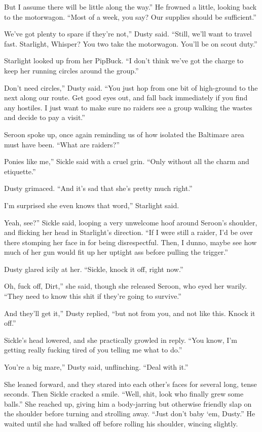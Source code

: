 \leavevmode{}But I assume there will be little along the way.” He frowned a little, looking back to the motorwagon. “Most of a week, you say? Our supplies should be sufficient.”

\leavevmode{}We’ve got plenty to spare if they’re not,” Dusty said. “Still, we’ll want to travel fast. Starlight, Whisper? You two take the motorwagon. You’ll be on scout duty.”

Starlight looked up from her PipBuck. “I don’t think we’ve got the charge to keep her running circles around the group.”

\leavevmode{}Don’t need circles,” Dusty said. “You just hop from one bit of high-ground to the next along our route. Get good eyes out, and fall back immediately if you find any hostiles. I just want to make sure no raiders see a group walking the wastes and decide to pay a visit.”

Seroon spoke up, once again reminding us of how isolated the Baltimare area must have been. “What are raiders?”

\leavevmode{}Ponies like me,” Sickle said with a cruel grin. “Only without all the charm and etiquette.”

Dusty grimaced. “And it’s sad that she’s pretty much right.”

\leavevmode{}I’m surprised she even knows that word,” Starlight said.

\leavevmode{}Yeah, see?” Sickle said, looping a very unwelcome hoof around Seroon’s shoulder, and flicking her head in Starlight’s direction. “If I were still a raider, I’d be over there stomping her face in for being disrespectful. Then, I dunno, maybe see how much of her gun would fit up her uptight ass before pulling the trigger.”

Dusty glared icily at her. “Sickle, knock it off, right now.”

\leavevmode{}Oh, fuck off, Dirt,” she said, though she released Seroon, who eyed her warily. “They need to know this shit if they’re going to survive.”

\leavevmode{}And they’ll get it,” Dusty replied, “but not from you, and not like this. Knock it off.”

Sickle’s head lowered, and she practically growled in reply. “You know, I’m getting really fucking tired of you telling me what to do.”

\leavevmode{}You’re a big mare,” Dusty said, unflinching. “Deal with it.”

She leaned forward, and they stared into each other’s faces for several long, tense seconds. Then Sickle cracked a smile. “Well, shit, look who finally grew some balls.” She reached up, giving him a body-jarring but otherwise friendly slap on the shoulder before turning and strolling away. “Just don’t baby ‘em, Dusty.” He waited until she had walked off before rolling his shoulder, wincing slightly.


